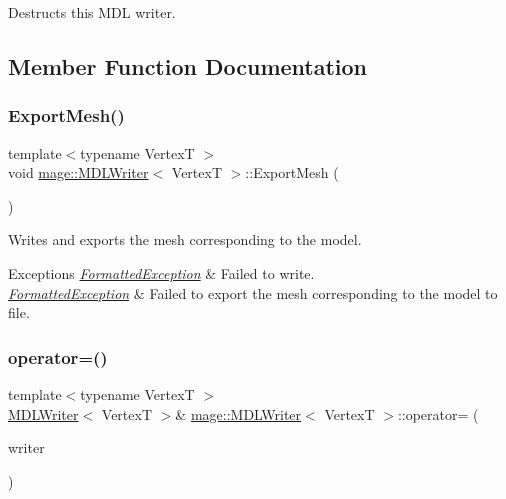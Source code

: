 Destructs this M\+DL writer. 

\subsection{Member Function Documentation}
\hypertarget{classmage_1_1_m_d_l_writer_af3f41c26153fe3d22b6a4d62140ca113}{}\label{classmage_1_1_m_d_l_writer_af3f41c26153fe3d22b6a4d62140ca113} 
\subsubsection{\texorpdfstring{Export\+Mesh()}{ExportMesh()}}
{\footnotesize\ttfamily template$<$typename VertexT $>$ \\
void \hyperlink{classmage_1_1_m_d_l_writer}{mage\+::\+M\+D\+L\+Writer}$<$ VertexT $>$\+::Export\+Mesh (\begin{DoxyParamCaption}{ }\end{DoxyParamCaption})\hspace{0.3cm}{\ttfamily [private]}}

Writes and exports the mesh corresponding to the model.


\begin{DoxyExceptions}{Exceptions}
{\em \hyperlink{classmage_1_1_formatted_exception}{Formatted\+Exception}} & Failed to write. \\
\hline
{\em \hyperlink{classmage_1_1_formatted_exception}{Formatted\+Exception}} & Failed to export the mesh corresponding to the model to file. \\
\hline
\end{DoxyExceptions}
\hypertarget{classmage_1_1_m_d_l_writer_a9ea7ddf81f38da846a749a82928e91e9}{}\label{classmage_1_1_m_d_l_writer_a9ea7ddf81f38da846a749a82928e91e9} 
\subsubsection{\texorpdfstring{operator=()}{operator=()}\hspace{0.1cm}{\footnotesize\ttfamily [1/2]}}
{\footnotesize\ttfamily template$<$typename VertexT $>$ \\
\hyperlink{classmage_1_1_m_d_l_writer}{M\+D\+L\+Writer}$<$ VertexT $>$\& \hyperlink{classmage_1_1_m_d_l_writer}{mage\+::\+M\+D\+L\+Writer}$<$ VertexT $>$\+::operator= (\begin{DoxyParamCaption}\item[{const \hyperlink{classmage_1_1_m_d_l_writer}{M\+D\+L\+Writer}$<$ VertexT $>$ \&}]{writer }\end{DoxyParamCaption})\hspace{0.3cm}{\ttfamily [delete]}}

